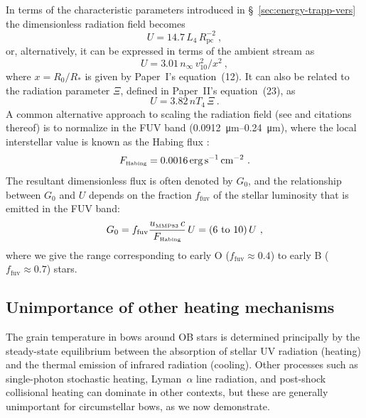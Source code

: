 In terms of the characteristic parameters introduced in
\S~\ref{sec:energy-trapp-vers} the dimensionless radiation field
becomes
\begin{equation}
  \label{eq:U-from-L4-and-Rpc}
  U = 14.7\, L_4\, R_{\text{pc}}^{-2} \ ,
\end{equation}
or, alternatively, it can be expressed in terms of the ambient stream as
\begin{equation}
  \label{eq:U-from-ambient}
  U = 3.01 \, n_\infty \, v_{10}^2 / x^2 \ , 
\end{equation}
where \(x = R_0/R_*\) is given by Paper~I's equation~(12).
It can also be related to the radiation parameter \(\Xi\), defined in
Paper~II's equation~(23), as
\begin{equation}
  \label{eq:U-vs-Xi}
  U = 3.82 \, n T_4 \, \Xi \ .
\end{equation}
A common alternative approach to scaling the radiation field (see
\citealp{Tielens:1985a} and citations thereof) is to normalize in the
FUV band (\SIrange{0.0912}{0.24}{\um}), where the local interstellar
value is known as the Habing flux \citep{Habing:1968a}:
\begin{equation}
  \label{eq:Habing-flux}
  F_{\text{\tiny Habing}} = \SI{0.0016}{erg.s^{-1}.cm^{-2}} \ .
\end{equation}
The resultant dimensionless flux is often denoted by \(G_0\), and the
relationship between \(G_0\) and \(U\) depends on the fraction
\(f_{\text{fuv}}\) of the stellar luminosity that is emitted in the
FUV band:
\begin{equation}
  \label{eq:G-vs-U}
  G_0 = f_{\text{fuv}} \frac{u\mmp\, c}{F\Hab} \,U = (\text{\numrange{6}{10}}) \,U \ ,
\end{equation}
where we give the range corresponding to early O (\(f_{\text{fuv}} \approx 0.4\)) to early B (\(f_{\text{fuv}} \approx 0.7\)) stars.


\subsection{Unimportance of other heating mechanisms}
\label{sec:unimp-other-heat}
The grain temperature in bows around OB stars is determined
principally by the steady-state equilibrium between the absorption of
stellar UV radiation (heating) and the thermal emission of infrared
radiation (cooling).  Other processes such as single-photon stochastic
heating, Lyman~\(\alpha\) line radiation, and post-shock collisional
heating can dominate in other contexts, but these are generally
unimportant for circumstellar bows, as we now demonstrate.

